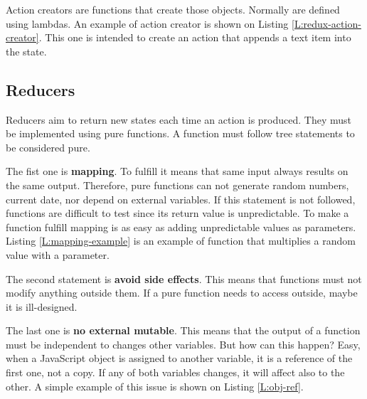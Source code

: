 Action creators are functions that create those objects. Normally are defined
using lambdas. An example of action creator is shown on Listing
\ref{L:redux-action-creator}. This one is intended to create an action that
appends a text item into the state.

\begin{codefigure}
\end{codefigure}

\subsection{Reducers}

Reducers aim to return new states each time an action is produced. They must be
implemented using pure functions. A function must follow tree statements to be 
considered pure.

The fist one is \textbf{mapping}. To fulfill it means that same input always 
results on the same output. Therefore, pure functions can not generate random
numbers, current date, nor depend on external variables. If this statement is
not followed, functions are difficult to test since its return value is
unpredictable. To make a function fulfill mapping is as easy as adding 
unpredictable values as parameters. Listing \ref{L:mapping-example} is an 
example of function that multiplies a random value with a parameter.

\begin{codefigure}
\end{codefigure}

The second statement is \textbf{avoid side effects}. This means that functions
must not modify anything outside them. If a pure function needs to access
outside, maybe it is ill-designed. 

\begin{codefigure}
\end{codefigure}

The last one is \textbf{no external mutable}. This means that the output of a
function must be independent to changes other variables. But how can this
happen? Easy, when a JavaScript object is assigned to another variable, it is a
reference of the first one, not a copy. If any of both variables changes, it
will affect also to the other. A simple example of this issue is shown on 
Listing \ref{L:obj-ref}.

